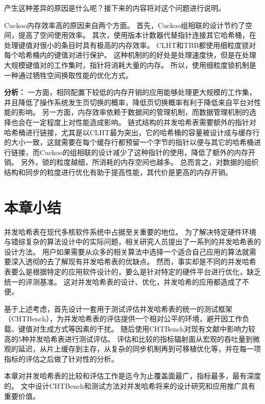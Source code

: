 产生这种差异的原因是什么呢？接下来的内容将对这个问题进行说明。

Cuckoo内存效率高的原因来自两个方面。
首先，Cuckoo组相联的设计节约了空间，提高了空间使用效率。
其次，使用版本计数器代替指针连接其它哈希桶，在处理键值对很小的条目时具有极高的内存效率。
CLHT和TBB都使用细粒度锁对每个哈希桶内的键值对进行保护。
这种机制的的好处是处理速度快，但是在处理大规模键值对的工作集时，指针将消耗大量的内存。
所以，使用细粒度锁机制是一种通过牺牲空间换取性能的优化方式。

\textbf{分析：} 一方面，相同配置下较低的内存开销的应用能够处理更大规模的工作集，并且降低了操作系统发生页切换的概率，降低页切换概率有利于降低来自平台对性能的影响。
另一方面，内存效率依赖于数据间的管理机制，而数据管理机制的选择也会在一定程度上对性能造成影响。
链式结构的并发哈希表需要额外的指针对哈希桶进行链接，尤其是以CLHT最为突出，它的哈希桶的容量被设计成与缓存行的大小一致，这就需要在每个缓存行都预留一个字节的指针以便与其它的哈希桶进行链接，而Cuckoo的组相联的设计减少了这种指针的使用，降低了额外的内存开销。
另外，锁的粒度越细，所消耗的内存空间也越多。
总而言之，对数据的组织结构和同步的粒度进行优化有助于提高性能，其代价是更高的内存开销。

\section{本章小结}
并发哈希表在现代多核软件系统中占据至关重要的地位。
为了解决特定硬件环境与错综复杂的算法设计中的实际问题，相关研究人员提出了一系列的并发哈希表的设计方法。
用户如果需要从众多的相关算法中选择一个适合自己应用的算法就需要深入透彻的去了解现有并发哈希表的优缺点。
然而，事实却是不同的并发哈希表要么是根据特定的应用软件设计的，要么是针对特定的硬件平台进行优化，缺乏统一的评测基准。
这对并发哈希表的设计、优化，并发哈希的应用都造成了不便。

基于上述考虑，首先设计一套用于测试评估并发哈希表的统一的测试框架（CHTBench），为并发哈希表的评估提供一个相对公平的环境，避开因工作负载、键值对生成方式等因素的干扰。
随后使用CHTBench对现有文献中影响力较高的5种并发哈希表进行测试评估。
评估和比较的指标辐射面从宏观的吞吐量到微观的延迟，从片上缓存到主存，从复杂的同步机制再到可移植优化等，并在每一项指标的评估之后做了针对性的分析。

本章对并发哈希表的比较和评估工作是迄今为止覆盖面最广，指标最多，最有深度的。
文中设计CHTBench和测试方法对并发哈希将来的设计研究和应用推广具有重要价值。 
